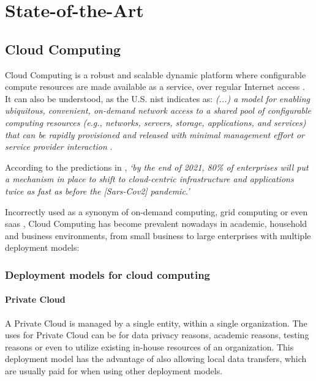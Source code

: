 \chapter{State-of-the-Art}\label{state-of-the-art}

\section{Cloud Computing}\label{state-of-the-art:s:cloud-computing}

Cloud Computing is a robust and scalable dynamic platform where configurable compute resources are made available as a service, over regular Internet access \Parencite{alnumay_2020}.
It can also be understood, as the U.S. \gls{nist} indicates as:
\textit{(...) a model for enabling ubiquitous, convenient, on-demand network access to a shared pool of configurable computing resources (e.g., networks, servers, storage, applications, and services) that can be rapidly provisioned and released with minimal management effort or service provider interaction} \Parencite{mell_grance_2011}. 

According to the predictions in \Parencite{idc_2021}, \textit{`by the end of 2021, 80\% of enterprises will put a mechanism in place to shift to cloud-centric infrastructure and applications twice as fast as before the [Sars-Cov2] pandemic.'}

Incorrectly used as a synonym of on-demand computing, grid computing or even \gls{saas} \Parencite{kim_2009}, Cloud Computing has become prevalent nowadays in academic, household and business environments, from small business to large enterprises \parencite{rezaei_chiew_lee_shams_aliee_2014} with multiple deployment models:

\subsection{Deployment models for cloud computing}\label{state-of-the-art:ss:deployment-models-for-cloud-computing}

\subsubsection{Private Cloud}\label{state-of-the-art:sss:private-cloud}
A Private Cloud is managed by a single entity, within a single organization. The uses for Private Cloud can be for data privacy reasons, academic reasons, testing reasons or even to utilize existing in-house resources of an organization. This deployment model has the advantage of also allowing local data transfers, which are usually paid for when using other deployment models.

